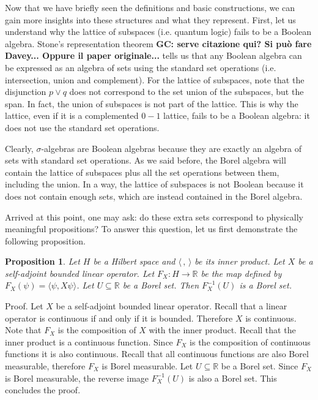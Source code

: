\documentclass[11pt, executivepaper]{article}
\newtheorem{prop}{Proposition}
\begin{document}
Now that we have briefly seen the definitions and basic constructions, we can gain more insights into these structures and what they represent. First, let us understand why the lattice of subspaces (i.e. quantum logic) fails to be a Boolean algebra. Stone's representation theorem \textbf{GC: serve citazione qui? Si pu\`o fare Davey... Oppure il paper originale... } tells us that any Boolean algebra can be expressed as an algebra of sets using the standard set operations (i.e. intersection, union and complement). For the lattice of subspaces, note that the disjunction $p \vee q$ does not correspond to the set union of the subspaces, but the span. In fact, the union of subspaces is not part of the lattice.  This is why the lattice, even if it is a complemented $0-1$ lattice, fails to be a Boolean algebra: it does not use the standard set operations.

Clearly, $\sigma$-algebras are Boolean algebras because they are exactly an algebra of sets with standard set operations. As we said before, the Borel algebra will contain the lattice of subspaces plus all the set operations between them, including the union. In a way, the lattice of subspaces is not Boolean because it does not contain enough sets, which are instead contained in the Borel algebra.

Arrived at this point, one may ask: do these extra sets correspond to physically meaningful propositions? To answer this question, let us first demonstrate the following proposition.

\begin{prop}
	Let $H$ be a Hilbert space and $\langle \, , \, \rangle$ be its inner product. Let $X$ be a self-adjoint bounded linear operator. Let $F_X : H \to \mathbb{R}$ be the map defined by $F_X(\psi) = \langle \psi , X \psi \rangle$. Let $U \subseteq \mathbb{R}$ be a Borel set. Then $F_X^{-1}(U)$ is a Borel set.
\end{prop}

Proof. Let $X$ be a self-adjoint bounded linear operator. Recall that a linear operator is continuous if and only if it is bounded. Therefore $X$ is continuous. Note that $F_X$ is the composition of $X$ with the inner product. Recall that the inner product is a continuous function. Since $F_X$ is the composition of continuous functions it is also continuous. Recall that all continuous functions are also Borel measurable, therefore $F_X$ is Borel measurable. Let $U \subseteq \mathbb{R}$ be a Borel set. Since $F_X$ is Borel measurable, the reverse image $F_X^{-1}(U)$ is also a Borel set. This concludes the proof.
\end{document}
